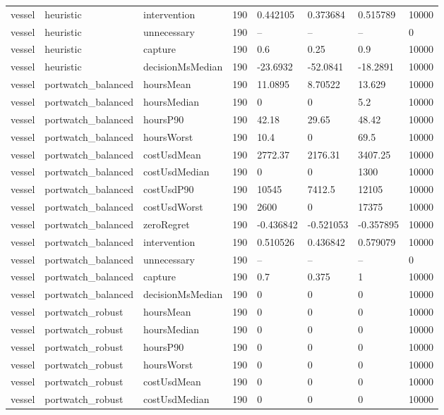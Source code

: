 \begin{tabular}{llllllll}
vessel & heuristic & intervention & 190 & 0.442105 & 0.373684 & 0.515789 & 10000 \\
vessel & heuristic & unnecessary & 190 & -- & -- & -- & 0 \\
vessel & heuristic & capture & 190 & 0.6 & 0.25 & 0.9 & 10000 \\
vessel & heuristic & decisionMsMedian & 190 & -23.6932 & -52.0841 & -18.2891 & 10000 \\
vessel & portwatch\_balanced & hoursMean & 190 & 11.0895 & 8.70522 & 13.629 & 10000 \\
vessel & portwatch\_balanced & hoursMedian & 190 & 0 & 0 & 5.2 & 10000 \\
vessel & portwatch\_balanced & hoursP90 & 190 & 42.18 & 29.65 & 48.42 & 10000 \\
vessel & portwatch\_balanced & hoursWorst & 190 & 10.4 & 0 & 69.5 & 10000 \\
vessel & portwatch\_balanced & costUsdMean & 190 & 2772.37 & 2176.31 & 3407.25 & 10000 \\
vessel & portwatch\_balanced & costUsdMedian & 190 & 0 & 0 & 1300 & 10000 \\
vessel & portwatch\_balanced & costUsdP90 & 190 & 10545 & 7412.5 & 12105 & 10000 \\
vessel & portwatch\_balanced & costUsdWorst & 190 & 2600 & 0 & 17375 & 10000 \\
vessel & portwatch\_balanced & zeroRegret & 190 & -0.436842 & -0.521053 & -0.357895 & 10000 \\
vessel & portwatch\_balanced & intervention & 190 & 0.510526 & 0.436842 & 0.579079 & 10000 \\
vessel & portwatch\_balanced & unnecessary & 190 & -- & -- & -- & 0 \\
vessel & portwatch\_balanced & capture & 190 & 0.7 & 0.375 & 1 & 10000 \\
vessel & portwatch\_balanced & decisionMsMedian & 190 & 0 & 0 & 0 & 10000 \\
vessel & portwatch\_robust & hoursMean & 190 & 0 & 0 & 0 & 10000 \\
vessel & portwatch\_robust & hoursMedian & 190 & 0 & 0 & 0 & 10000 \\
vessel & portwatch\_robust & hoursP90 & 190 & 0 & 0 & 0 & 10000 \\
vessel & portwatch\_robust & hoursWorst & 190 & 0 & 0 & 0 & 10000 \\
vessel & portwatch\_robust & costUsdMean & 190 & 0 & 0 & 0 & 10000 \\
vessel & portwatch\_robust & costUsdMedian & 190 & 0 & 0 & 0 & 10000 \\

\end{tabular}
